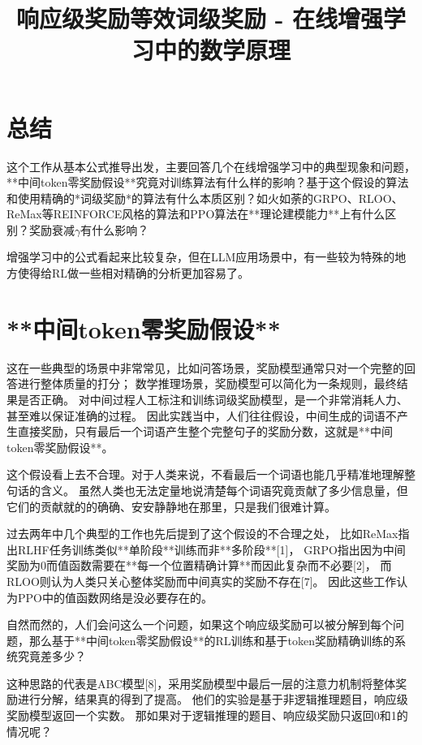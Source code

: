 \documentclass[11pt,english]{ctexart}
\begin{document}
\title{响应级奖励等效词级奖励 - 在线增强学习中的数学原理}

\maketitle

\section{总结}

这个工作从基本公式推导出发，主要回答几个在线增强学习中的典型现象和问题，**中间token零奖励假设**究竟对训练算法有什么样的影响？基于这个假设的算法和使用精确的*词级奖励*的算法有什么本质区别？如火如荼的GRPO、RLOO、ReMax等REINFORCE风格的算法和PPO算法在**理论建模能力**上有什么区别？奖励衰减$\gamma$有什么影响？

增强学习中的公式看起来比较复杂，但在LLM应用场景中，有一些较为特殊的地方使得给RL做一些相对精确的分析更加容易了。

\section{**中间token零奖励假设**}

这在一些典型的场景中非常常见，比如问答场景，奖励模型通常只对一个完整的回答进行整体质量的打分；
数学推理场景，奖励模型可以简化为一条规则，最终结果是否正确。
对中间过程人工标注和训练词级奖励模型，是一个非常消耗人力、甚至难以保证准确的过程。
因此实践当中，人们往往假设，中间生成的词语不产生直接奖励，只有最后一个词语产生整个完整句子的奖励分数，这就是**中间token零奖励假设**。

这个假设看上去不合理。对于人类来说，不看最后一个词语也能几乎精准地理解整句话的含义。
虽然人类也无法定量地说清楚每个词语究竟贡献了多少信息量，但它们的贡献就的的确确、安安静静地在那里，只是我们很难计算。

过去两年中几个典型的工作也先后提到了这个假设的不合理之处，
比如ReMax指出RLHF任务训练类似**单阶段**训练而非**多阶段**[1]，
GRPO指出因为中间奖励为0而值函数需要在**每一个位置精确计算**而因此复杂而不必要[2]，
而RLOO则认为人类只关心整体奖励而中间真实的奖励不存在[7]。
因此这些工作认为PPO中的值函数网络是没必要存在的。

自然而然的，人们会问这么一个问题，如果这个响应级奖励可以被分解到每个问题，那么基于**中间token零奖励假设**的RL训练和基于token奖励精确训练的系统究竟差多少？

这种思路的代表是ABC模型[8]，采用奖励模型中最后一层的注意力机制将整体奖励进行分解，结果真的得到了提高。
他们的实验是基于非逻辑推理题目，响应级奖励模型返回一个实数。
那如果对于逻辑推理的题目、响应级奖励只返回0和1的情况呢？
\end{document}
